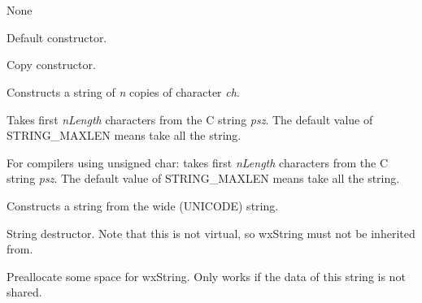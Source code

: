 \section{}\label{wxstring}


None




\label{wxstringconstruct}


Default constructor.


Copy constructor.


Constructs a string of {\it n} copies of character {\it ch}.


Takes first {\it nLength} characters from the C string {\it psz}.
The default value of STRING\_MAXLEN means take all the string.


For compilers using unsigned char: takes first {\it nLength} characters from the C string {\it psz}.
The default value of STRING\_MAXLEN means take all the string.


Constructs a string from the wide (UNICODE) string.

\label{wxstringdestruct}


String destructor. Note that this is not virtual, so wxString must not be inherited from.

\label{wxstringAlloc}


Preallocate some space for wxString. Only works if the data of this string is not shared.

